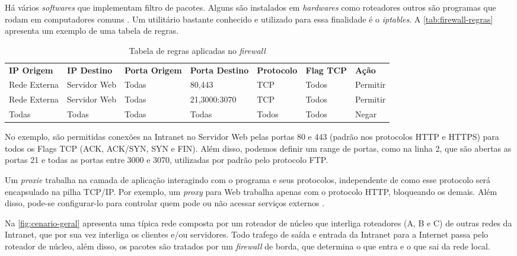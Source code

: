 Há vários \textit{softwares} que implementam filtro de pacotes. Alguns são instalados em \textit{hardwares} como roteadores outros são programas que rodam em computadores comuns \cite{univhacker}. Um utilitário bastante conhecido e utilizado para essa finalidade é o \textit{iptables}. A \autoref{tab:firewall-regras} apresenta um exemplo de uma tabela de regras.

\begin{table}[htb]
\ABNTEXfontereduzida
\caption{Tabela de regras aplicadas no \textit{firewall}}
\label{tab:firewall-regras}
\begin{tabular}{l|l|l|l|l|l|l}
    \textbf{IP Origem} & \textbf{IP Destino}  & \textbf{Porta Origem}  & \textbf{Porta Destino} & \textbf{Protocolo} & \textbf{Flag TCP} & \textbf{Ação} \\
    Rede Externa & Servidor Web & Todas & 80,443 & TCP & Todos & Permitir \\
    Rede Externa & Servidor Web & Todas & 21,3000:3070 & TCP & Todos & Permitir \\
    Todas & Todas & Todas & Todas & Todos & Todos & Negar \\
\end{tabular}
\end{table}

No exemplo, são permitidas conexões na Intranet no Servidor Web pelas portas 80 e 443 (padrão nos protocolos HTTP e HTTPS) para todos os Flags TCP (ACK, ACK/SYN, SYN e FIN). Além disso, podemos definir um range de portas, como na linha 2, que são abertas as portas 21 e todas as portas entre 3000 e 3070, utilizadas por padrão pelo protocolo FTP.

Um \textit{proxie} trabalha na camada de aplicação interagindo com o programa e seus protocolos, independente de como esse protocolo será encapsulado na pilha TCP/IP. Por exemplo, um \textit{proxy} para Web trabalha apenas com o protocolo HTTP, bloqueando os demais. Além disso, pode-se configurar-lo para controlar quem pode ou não acessar serviços externos \cite{univhacker}.


Na \autoref{fig:cenario-geral} apresenta uma típica rede composta por um roteador de núcleo que interliga roteadores (A, B e C) de outras redes da Intranet, que por sua vez interliga os clientes e/ou servidores. Todo trafego de saída e entrada da Intranet para a Internet passa pelo roteador de núcleo, além disso, os pacotes são tratados por um \textit{firewall} de borda, que determina o que entra e o que sai da rede local.

